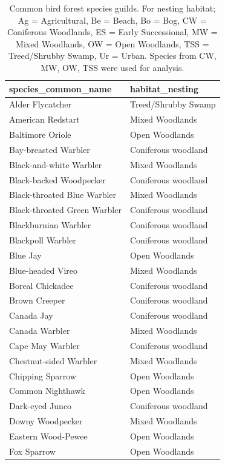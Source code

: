 \documentclass[
  letterpaper,
  DIV=11,
  numbers=noendperiod]{scrartcl}
\begin{document}
\begin{longtable}[]{@{}ll@{}}

\caption{\label{tbl-bird-guilds}Common bird forest species guilds. For
nesting habitat; Ag = Agricultural, Be = Beach, Bo = Bog, CW =
Coniferous Woodlands, ES = Early Successional, MW = Mixed Woodlands, OW
= Open Woodlands, TSS = Treed/Shrubby Swamp, Ur = Urban. Species from
CW, MW, OW, TSS were used for analysis.}

\tabularnewline

\toprule\noalign{}
species\_common\_name & habitat\_nesting \\
\midrule\noalign{}
\endhead
\bottomrule\noalign{}
\endlastfoot
Alder Flycatcher & Treed/Shrubby Swamp \\
American Redstart & Mixed Woodlands \\
Baltimore Oriole & Open Woodlands \\
Bay-breasted Warbler & Coniferous woodland \\
Black-and-white Warbler & Mixed Woodlands \\
Black-backed Woodpecker & Coniferous woodland \\
Black-throated Blue Warbler & Mixed Woodlands \\
Black-throated Green Warbler & Coniferous woodland \\
Blackburnian Warbler & Coniferous woodland \\
Blackpoll Warbler & Coniferous woodland \\
Blue Jay & Open Woodlands \\
Blue-headed Vireo & Mixed Woodlands \\
Boreal Chickadee & Coniferous woodland \\
Brown Creeper & Coniferous woodland \\
Canada Jay & Coniferous woodland \\
Canada Warbler & Mixed Woodlands \\
Cape May Warbler & Coniferous woodland \\
Chestnut-sided Warbler & Mixed Woodlands \\
Chipping Sparrow & Open Woodlands \\
Common Nighthawk & Open Woodlands \\
Dark-eyed Junco & Coniferous woodland \\
Downy Woodpecker & Mixed Woodlands \\
Eastern Wood-Pewee & Open Woodlands \\
Fox Sparrow & Open Woodlands \\

\end{longtable}
\end{document}

